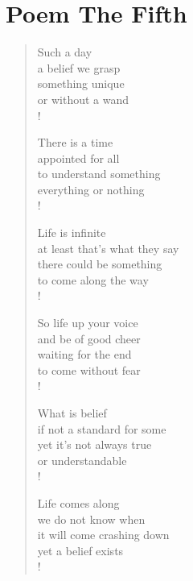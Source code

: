 \section{Poem The Fifth}

\settowidth{\versewidth}{Than Tycho Brahe, or Erra Pater:}
\begin{verse}
Such a day \\
a belief we grasp \\
something unique \\
or without a wand \\!

There is a time \\
appointed for all \\
to understand something \\
everything or nothing \\!

Life is infinite \\
at least that's what they say \\
there could be something \\
to come along the way \\!

So life up your voice \\
and be of good cheer \\
waiting for the end \\
to come without fear \\!

What is belief \\
if not a standard for some \\
yet it's not always true \\
or understandable \\!

Life comes along \\
we do not know when \\
it will come crashing down \\
yet a belief exists \\!
\end{verse}
